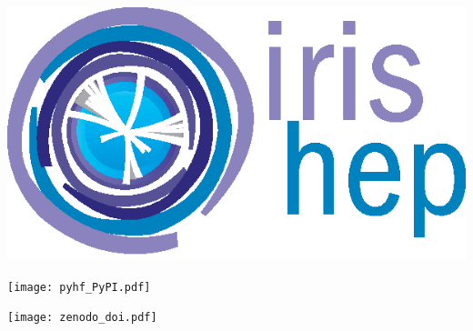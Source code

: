 \documentclass[a0paper,fleqn]{betterposter}
\begin{document}
{ \vspace{1em}
 \vfill
 \begin{minipage}{0.58\textwidth}
  \begin{center}
   \includegraphics[width=\textwidth]{IRIS-HEP_logo}
  \end{center}
 \end{minipage}%
 \quad
 \begin{minipage}{0.38\textwidth}
  \begin{center}
   \texttt{[image: pyhf\_PyPI.pdf]}
  \end{center}
  \vspace{1em}
  \begin{center}
   \texttt{[image: zenodo\_doi.pdf]}
  \end{center}
  \vspace{3em}
 \end{minipage}%
}
\end{document}
